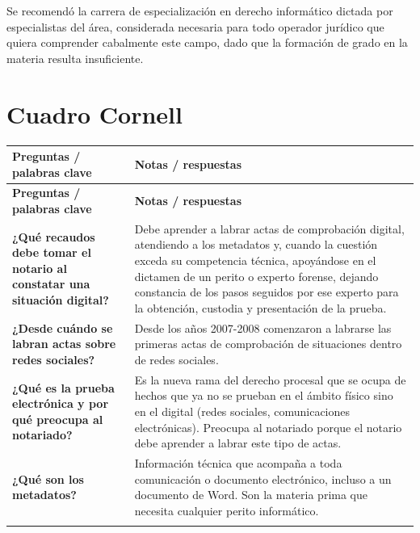 \documentclass[12pt,oneside]{book}
\newlength{\cornellizq}
\newlength{\cornellder}
\begin{document}
\begin{note}
Se recomendó la carrera de especialización en derecho informático dictada por especialistas del área, considerada necesaria para todo operador jurídico que quiera comprender cabalmente este campo, dado que la formación de grado en la materia resulta insuficiente.
\end{note}

\section{Cuadro Cornell}

\begin{longtable}{
    >{\raggedright\arraybackslash}p{\cornellizq}
    >{\raggedright\arraybackslash}p{\cornellder}
}
\toprule
\textbf{Preguntas / palabras clave} & \textbf{Notas / respuestas} \\
\midrule
\endfirsthead
\toprule
\textbf{Preguntas / palabras clave} & \textbf{Notas / respuestas} \\
\midrule
\endhead

\textbf{¿Qué recaudos debe tomar el notario al constatar una situación digital?} &
Debe aprender a labrar actas de comprobación digital, atendiendo a los metadatos y, cuando la cuestión exceda su competencia técnica, apoyándose en el dictamen de un perito o experto forense, dejando constancia de los pasos seguidos por ese experto para la obtención, custodia y presentación de la prueba. \\
\addlinespace[0.6em]
\midrule[\lightrulewidth]

\textbf{¿Desde cuándo se labran actas sobre redes sociales?} &
Desde los años 2007-2008 comenzaron a labrarse las primeras actas de comprobación de situaciones dentro de redes sociales. \\
\addlinespace[0.6em]
\midrule[\lightrulewidth]

\textbf{¿Qué es la prueba electrónica y por qué preocupa al notariado?} &
Es la nueva rama del derecho procesal que se ocupa de hechos que ya no se prueban en el ámbito físico sino en el digital (redes sociales, comunicaciones electrónicas). Preocupa al notariado porque el notario debe aprender a labrar este tipo de actas. \\
\addlinespace[0.6em]
\midrule[\lightrulewidth]

\textbf{¿Qué son los metadatos?} &
Información técnica que acompaña a toda comunicación o documento electrónico, incluso a un documento de Word. Son la materia prima que necesita cualquier perito informático. \\
\addlinespace[0.6em]
\midrule[\lightrulewidth]


\end{longtable}
\end{document}
